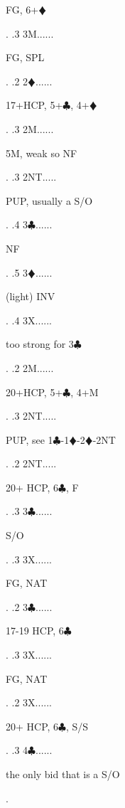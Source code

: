 \documentclass[a4paper]{article}
\newcommand{\BC}{\textcolor{OliveGreen}{$\clubsuit$}}
\newcommand{\BD}{\textcolor{RedOrange}{$\vardiamondsuit$}}
\begin{document}
{\begin{minipage}[t]{0.8\textwidth}
FG, 6+\BD 
\end{minipage}. 
 .3 3M......\begin{minipage}[t]{0.8\textwidth}
FG, SPL
\end{minipage}. 
 .2 2\BD......\begin{minipage}[t]{0.8\textwidth}
17+HCP, 5+\BC , 4+\BD 
\end{minipage}. 
 .3 2M......\begin{minipage}[t]{0.8\textwidth}
5M, weak so NF
\end{minipage}. 
 .3 2NT.....\begin{minipage}[t]{0.8\textwidth}
PUP, usually a S/O
\end{minipage}. 
 .4 3\BC......\begin{minipage}[t]{0.8\textwidth}
NF
\end{minipage}. 
 .5 3\BD......\begin{minipage}[t]{0.8\textwidth}
(light) INV
\end{minipage}. 
 .4 3X......\begin{minipage}[t]{0.8\textwidth}
too strong for 3\BC 
\end{minipage}. 
 .2 2M......\begin{minipage}[t]{0.8\textwidth}
20+HCP, 5+\BC , 4+M
\end{minipage}. 
 .3 2NT.....\begin{minipage}[t]{0.8\textwidth}
PUP, see 1\BC -1\BD -2\BD -2NT
\end{minipage}. 
 .2 2NT.....\begin{minipage}[t]{0.8\textwidth}
20+ HCP, 6\BC , F
\end{minipage}. 
 .3 3\BC......\begin{minipage}[t]{0.8\textwidth}
S/O
\end{minipage}. 
 .3 3X......\begin{minipage}[t]{0.8\textwidth}
FG, NAT
\end{minipage}. 
 .2 3\BC......\begin{minipage}[t]{0.8\textwidth}
17-19 HCP, 6\BC 
\end{minipage}. 
 .3 3X......\begin{minipage}[t]{0.8\textwidth}
FG, NAT
\end{minipage}. 
 .2 3X......\begin{minipage}[t]{0.8\textwidth}
20+ HCP, 6\BC , S/S
\end{minipage}. 
 .3 4\BC......\begin{minipage}[t]{0.8\textwidth}
the only bid that is a S/O
\end{minipage}. 
}
\end{document}
